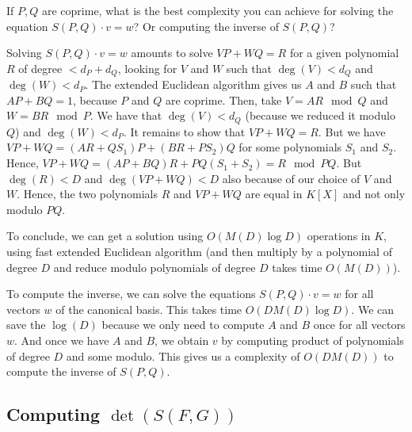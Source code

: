 \documentclass[11pt]{exam}
\theoremstyle{definition}
\begin{document}
{\begin{questions}
	
	\question If $P, Q$ are coprime, what is the best complexity you can achieve for solving the equation $S(P, Q)\cdot v = w$? Or computing
	the inverse of $S(P, Q)$?
	
	\begin{solution}
		Solving $S(P,Q) \cdot v = w$ amounts to solve $VP+WQ = R$ for a given polynomial $R$ of degree $< d_P+d_Q$, looking for $V$ and $W$ such that $\deg(V) < d_Q$ and $\deg(W) < d_P$. The extended Euclidean algorithm gives us $A$ and $B$ such that $AP + BQ = 1$, because $P$ and $Q$ are coprime. Then, take $V = AR \mod Q$ and $W = BR \mod P$. We have that $\deg(V) < d_Q$ (because we reduced it modulo $Q$) and $\deg(W) < d_P$. It remains to show that $VP+WQ = R$.
		But we have $VP+WQ = (AR+QS_1)P + (BR+PS_2)Q$ for some polynomials $S_1$ and $S_2$. Hence, $VP+WQ = (AP + BQ)R + PQ(S_1+S_2) = R \mod PQ$. But $\deg(R) < D$ and $\deg(VP+WQ) < D$ also because of our choice of $V$ and $W$. Hence, the two polynomials $R$ and $VP+WQ$ are equal in $K[X]$ and not only modulo $PQ$.
		
		To conclude, we can get a solution using $O(M(D)\log D)$ operations in $K$, using fast extended Euclidean algorithm (and then multiply by a polynomial of degree $D$ and reduce modulo polynomials of degree $D$ takes time $O(M(D))$).
		
		To compute the inverse, we can solve the equations $S(P,Q) \cdot v = w$ for all vectors $w$ of the canonical basis. This takes time $O(DM(D)\log D)$. We can save the $\log(D)$ because we only need to compute $A$ and $B$ once for all vectors $w$. And once we have $A$ and $B$, we obtain $v$ by computing product of polynomials of degree $D$ and some modulo. This gives us a complexity of $O(DM(D))$ to compute the inverse of $S(P,Q)$.
	\end{solution}
	
\end{questions}

\subsection{Computing $\det(S(F,G))$}

\newcommand{\Res}{\ensuremath{\mathsf{Res}}}
\newcommand{\LC}{\ensuremath{\mathsf{LC}}}

}
\end{document}
